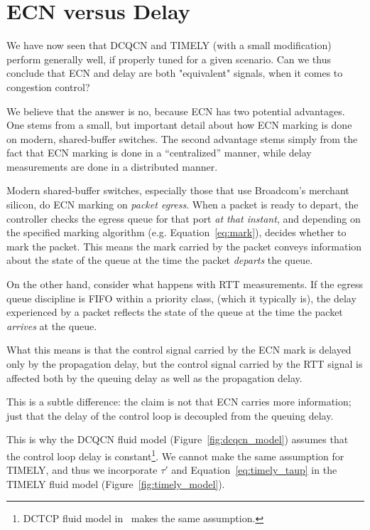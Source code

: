 \vspace{-1em}
\section {ECN versus Delay}
\label{sec:discuss}

We have now seen that DCQCN and TIMELY (with a small modification) perform
generally well, if properly tuned for a given scenario. Can we thus conclude
that ECN and delay are both "equivalent" signals, when it comes to congestion
control? 

We believe that the answer is no, because ECN has two potential advantages.  One
stems from a small, but important detail about how ECN marking is done on
modern, shared-buffer switches.  The second advantage stems simply from the fact
that ECN marking is done in a ``centralized'' manner, while delay measurements
are done in a distributed manner.

Modern shared-buffer switches, especially those that use Broadcom's merchant
silicon, do ECN marking on {\em packet egress}. When a packet is ready to
depart, the controller checks the egress queue for that port {\em at that
instant}, and depending on the specified marking algorithm (e.g.
Equation~\ref{eq:mark}), decides whether to mark the packet. This means the mark
carried by the packet conveys information about the state of the queue at the
time the packet {\em departs} the queue. 

On the other hand, consider what happens with RTT measurements. If the egress
queue discipline is FIFO within a priority class, (which it typically is), the
delay experienced by a packet reflects the state of the queue at the time the
packet {\em arrives} at the queue. 

What this means is that the control signal carried by the ECN mark is delayed
only by the propagation delay, but the control signal carried by the RTT signal
is affected both by the queuing delay as well as the propagation delay. 

This is a subtle difference: the claim is not that ECN carries more information;
just that the delay of the control loop is decoupled from the queuing delay.

This is why the DCQCN fluid model (Figure~\ref{fig:dcqcn_model}) assumes that
the control loop delay is constant\footnote{DCTCP fluid model
in~\cite{dctcp-analysis} makes the same assumption.}. We cannot make the same
assumption for TIMELY, and  thus we incorporate $\tau'$ and
Equation~\ref{eq:timely_taup} in the TIMELY fluid model
(Figure~\ref{fig:timely_model}).

